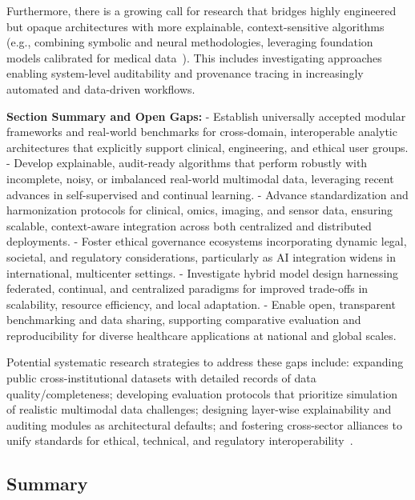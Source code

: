 \documentclass[sigconf]{acmart}
\begin{document}
Furthermore, there is a growing call for research that bridges highly engineered but opaque architectures with more explainable, context-sensitive algorithms (e.g., combining symbolic and neural methodologies, leveraging foundation models calibrated for medical data~\cite{ref11,ref43,ref70}). This includes investigating approaches enabling system-level auditability and provenance tracing in increasingly automated and data-driven workflows.

\textbf{Section Summary and Open Gaps:}  
- Establish universally accepted modular frameworks and real-world benchmarks for cross-domain, interoperable analytic architectures that explicitly support clinical, engineering, and ethical user groups.
- Develop explainable, audit-ready algorithms that perform robustly with incomplete, noisy, or imbalanced real-world multimodal data, leveraging recent advances in self-supervised and continual learning.
- Advance standardization and harmonization protocols for clinical, omics, imaging, and sensor data, ensuring scalable, context-aware integration across both centralized and distributed deployments.
- Foster ethical governance ecosystems incorporating dynamic legal, societal, and regulatory considerations, particularly as AI integration widens in international, multicenter settings.
- Investigate hybrid model design harnessing federated, continual, and centralized paradigms for improved trade-offs in scalability, resource efficiency, and local adaptation.
- Enable open, transparent benchmarking and data sharing, supporting comparative evaluation and reproducibility for diverse healthcare applications at national and global scales.

Potential systematic research strategies to address these gaps include: expanding public cross-institutional datasets with detailed records of data quality/completeness; developing evaluation protocols that prioritize simulation of realistic multimodal data challenges; designing layer-wise explainability and auditing modules as architectural defaults; and fostering cross-sector alliances to unify standards for ethical, technical, and regulatory interoperability~\cite{ref11,ref37,ref44,ref45,ref65,ref70,ref78,ref84}.

\subsection{Summary}
\end{document}

